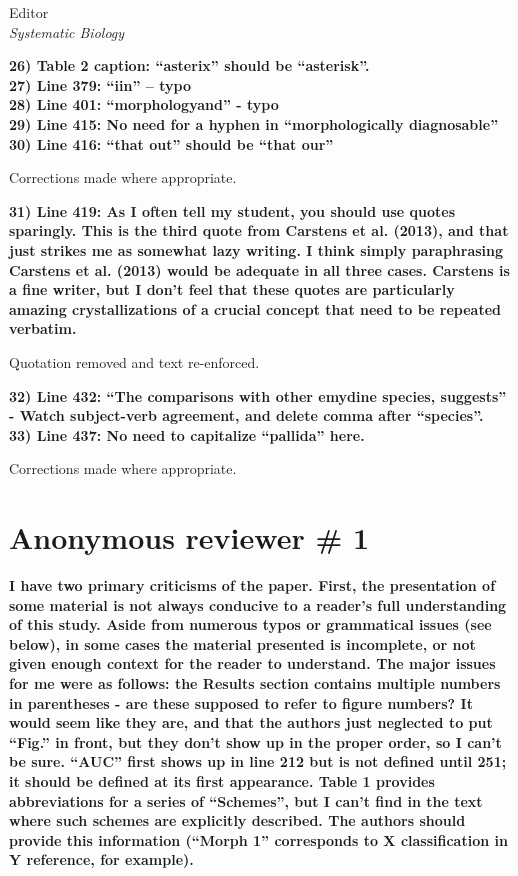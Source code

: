 \documentclass{letter}
\begin{document}
\begin{letter}{Editor \\ \textit{Systematic Biology}}

  \textbf{26) Table 2 caption: ``asterix'' should be ``asterisk''. \\
    27) Line 379: ``iin'' – typo \\
    28) Line 401: ``morphologyand'' - typo \\
    29) Line 415: No need for a hyphen in ``morphologically diagnosable''\\
  30) Line 416: ``that out'' should be ``that our'' }

  Corrections made where appropriate.

  \textbf{31) Line 419: As I often tell my student, you should use quotes sparingly. This is the third quote from Carstens et al. (2013), and that just strikes me as somewhat lazy writing. I think simply paraphrasing Carstens et al. (2013) would be adequate in all three cases. Carstens is a fine writer, but I don’t feel that these quotes are particularly amazing crystallizations of a crucial concept that need to be repeated verbatim. }

  Quotation removed and text re-enforced.

  \textbf{32) Line 432: ``The comparisons with other emydine species, suggests'' - Watch subject-verb agreement, and delete comma after “species”. \\
  33) Line 437: No need to capitalize ``pallida'' here. }

  Corrections made where appropriate.


  \section{Anonymous reviewer \# 1}

  \textbf{I have two primary criticisms of the paper. First, the presentation of some material is not always conducive to a reader’s full understanding of this study. Aside from numerous typos or grammatical issues (see below), in some cases the material presented is incomplete, or not given enough context for the reader to understand. The major issues for me were as follows: the Results section contains multiple numbers in parentheses - are these supposed to refer to figure numbers? It would seem like they are, and that the authors just neglected to put ``Fig.'' in front, but they don’t show up in the proper order, so I can’t be sure. ``AUC'' first shows up in line 212 but is not defined until 251; it should be defined at its first appearance. Table 1 provides abbreviations for a series of ``Schemes'', but I can’t find in the text where such schemes are explicitly described. The authors should provide this information (``Morph 1'' corresponds to X classification in Y reference, for example). }


\end{letter}
\end{document}
